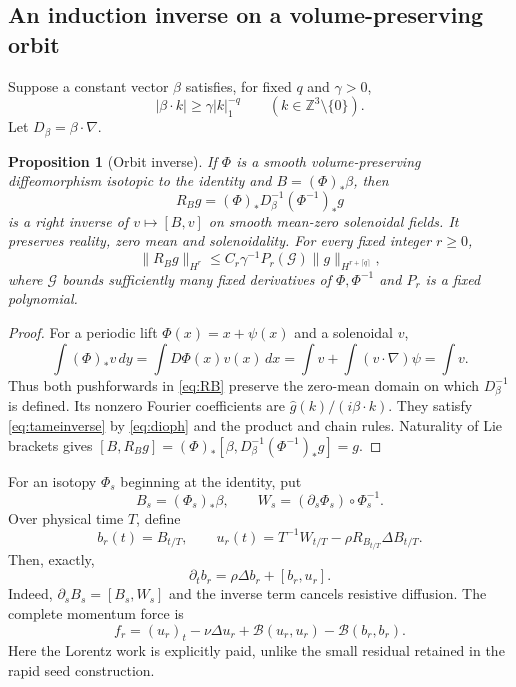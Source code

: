\documentclass[11pt,a4paper]{amsart}
\newtheorem{proposition}[theorem]{Proposition}
\theoremstyle{definition}
\theoremstyle{remark}
\numberwithin{equation}{section}
\newcommand{\Z}{\mathbb Z}
\newcommand{\Bcal}{\mathcal B}
\newcommand{\norm}[1]{\lVert #1\rVert}
\newcommand{\push}[1]{(#1)_*}
\begin{document}
\subsection{An induction inverse on a volume-preserving orbit}
Suppose a constant vector $\beta$ satisfies, for fixed $q$ and $\gamma>0$,
\begin{equation}\label{eq:dioph}
 |\beta\cdot k|\ge\gamma |k|_1^{-q}\qquad(k\in\Z^3\setminus\{0\}).
\end{equation}
Let $D_\beta=\beta\cdot\nabla$.

\begin{proposition}[Orbit inverse]\label{prop:inverse}
If $\Phi$ is a smooth volume-preserving diffeomorphism isotopic to the identity and $B=\push\Phi\beta$, then
\begin{equation}\label{eq:RB}
 R_Bg=\push\Phi D_\beta^{-1}\push{\Phi^{-1}}g
\end{equation}
is a right inverse of $v\mapsto[B,v]$ on smooth mean-zero solenoidal fields. It preserves reality, zero mean and solenoidality. For every fixed integer $r\ge0$,
\begin{equation}\label{eq:tameinverse}
 \norm{R_Bg}_{H^r}
 \le C_r\gamma^{-1}P_r(\mathcal G)\norm g_{H^{r+\lceil q\rceil}},
\end{equation}
where $\mathcal G$ bounds sufficiently many fixed derivatives of $\Phi,\Phi^{-1}$ and $P_r$ is a fixed polynomial.
\end{proposition}

\begin{proof}
For a periodic lift $\Phi(x)=x+\psi(x)$ and a solenoidal $v$,
\begin{equation}\label{eq:meanpush}
 \int\push\Phi v\,dy=\int D\Phi(x)v(x)\,dx
 =\int v+\int(v\cdot\nabla)\psi=\int v.
\end{equation}
Thus both pushforwards in \eqref{eq:RB} preserve the zero-mean domain on which $D_\beta^{-1}$ is defined. Its nonzero Fourier coefficients are $\widehat g(k)/(i\beta\cdot k)$. They satisfy \eqref{eq:tameinverse} by \eqref{eq:dioph} and the product and chain rules. Naturality of Lie brackets gives
$[B,R_Bg]=\push\Phi[\beta,D_\beta^{-1}\push{\Phi^{-1}}g]=g$.
\end{proof}

For an isotopy $\Phi_s$ beginning at the identity, put
\[
 B_s=\push{\Phi_s}\beta,\qquad
 W_s=(\partial_s\Phi_s)\circ\Phi_s^{-1}.
\]
Over physical time $T$, define
\begin{equation}\label{eq:guidevelocity}
 b_r(t)=B_{t/T},\qquad
 u_r(t)=T^{-1}W_{t/T}-\rho R_{B_{t/T}}\Delta B_{t/T}.
\end{equation}
Then, exactly,
\begin{equation}\label{eq:guideinduction}
 \partial_tb_r=\rho\Delta b_r+[b_r,u_r].
\end{equation}
Indeed, $\partial_sB_s=[B_s,W_s]$ and the inverse term cancels resistive diffusion. The complete momentum force is
\begin{equation}\label{eq:guideforce}
 f_r=(u_r)_t-\nu\Delta u_r+
 \Bcal(u_r,u_r)-\Bcal(b_r,b_r).
\end{equation}
Here the Lorentz work is explicitly paid, unlike the small residual retained in the rapid seed construction.
\end{document}
